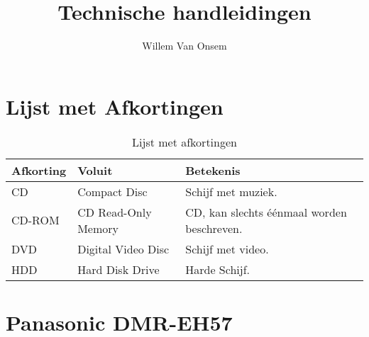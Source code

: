 \documentclass[a4paper,10pt]{book}
\title{Technische handleidingen}
\author{Willem Van Onsem}
\begin{document}
\begin{titlepage}
\maketitle
\end{titlepage}
\listoftables
\tableofcontents
\chapter{Lijst met Afkortingen}
\begin{table}[hbt]
\centering
\begin{tabularx}{\textwidth}{l l X}
\toprule
\textbf{Afkorting}&\textbf{Voluit}&\textbf{Betekenis}\\\midrule
CD&Compact Disc&Schijf met muziek.\\
CD-ROM&CD Read-Only Memory&CD, kan slechts \'e\'enmaal worden beschreven.\\
DVD&Digital Video Disc&Schijf met video.\\
HDD&Hard Disk Drive&Harde Schijf.\\
\bottomrule
\end{tabularx}
\caption{Lijst met afkortingen}
\end{table}
\chapter{Panasonic DMR-EH57}
\end{document}
